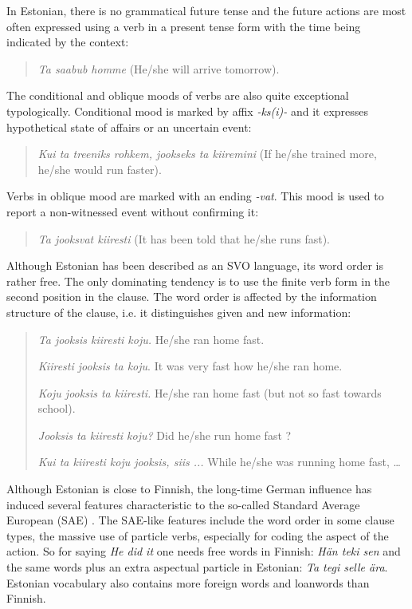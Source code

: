 \documentclass[]{../metanetpaper}
\begin{document}
\begin{multicols}{2}
In Estonian, there is no grammatical future tense and the future actions are most often expressed using a verb in a present tense form with the time being indicated by the context:

\begin{quote}
\textit{Ta saabub homme} (He/she will arrive tomorrow). 
\end{quote}

The conditional and oblique moods of verbs are also quite exceptional typologically. 
Conditional mood is marked by affix \textit{-ks(i)-} and it expresses
hypothetical state of affairs or an uncertain event: 

\begin{quote}
\textit{Kui ta treeniks rohkem, jookseks ta kiire\-mini} (If he/she
trained more, he/she would run faster).
\end{quote}

Verbs in oblique mood are marked with an ending \textit{-vat}. 
This mood is used to report a non-witnessed event without conﬁrming it:

\begin{quote}
\textit{Ta jooksvat kiiresti} (It has been told that he/she runs fast).
\end{quote}

Although Estonian has been described as an SVO language, its word order is rather free. 
The only dominating tendency is to use the ﬁnite verb form in the second position in the clause. 
The word order is affected by the information structure of the clause,
i.e. it distinguishes given and new information:

\begin{quote}

\textit{Ta jooksis kiiresti koju.} 	He/she ran home fast.

\textit{Kiiresti jooksis ta koju}. 	It was very fast how he/she ran
home.

\textit{Koju jooksis ta kiiresti.} 	He/she ran home fast (but not so 
				fast towards school).

\textit{Jooksis ta kiiresti koju?} 	Did he/she run home fast ?

\textit{Kui ta kiiresti koju jooksis, siis ...}	While he/she was running home 
			fast, \ldots

\end{quote}

Although Estonian is close to Finnish, the long-time German influence has induced several features characteristic to the so-called Standard Average European (SAE) \cite{Metslang09}. 
The SAE-like features include the word order in some clause types, the massive use of particle verbs, especially for coding the aspect of the action. 
So for saying \textit{He did it} one needs free words in Finnish: \textit{Hän teki sen} and the same words plus an extra aspectual particle in Estonian: \textit{Ta tegi selle ära}. 
Estonian vocabulary also contains more foreign words and loanwords than Finnish.


\end{multicols}
\end{document}

